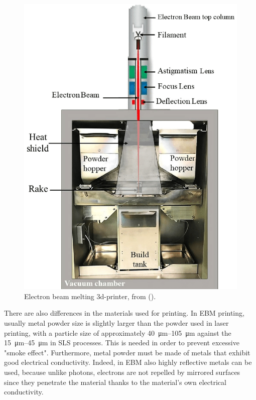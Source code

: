 \begin{figure}
    \centering
    \includegraphics[scale=0.3]{Images/A-schematic-of-electron-beam-melting-EBM.png}
    \caption[EBM 3d-printer.]{Electron beam melting 3d-printer, from        \citeauthor{azam_-depth_2018} (\citeyear{azam_-depth_2018}).}
    \label{fig:ebm_printer}
\end{figure}
 There are also differences in the materials used for printing. In EBM printing, usually metal powder size is slightly larger than the powder used in laser printing, with a particle size of approximately \SIrange[range-phrase = --]{40}{105}{\micro\meter} against the \SIrange[range-phrase = --]{15}{45}{\micro\meter} in SLS processes. This is needed in order to prevent excessive "smoke effect". Furthermore, metal powder must be made of metals that exhibit good electrical conductivity. Indeed, in EBM also highly reflective metals can be used, because unlike photons, electrons are not repelled by mirrored surfaces since they penetrate the material thanks to the material's own electrical conductivity.

